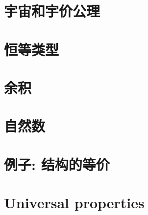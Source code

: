 \section{宇宙和宇价公理}
\label{sec:compute-universe}


\section{恒等类型}
\label{sec:compute-paths}


\section{余积}
\label{sec:compute-coprod}


\section{自然数}
\label{sec:compute-nat}


\section{例子: 结构的等价}
\label{sec:equality-of-structures}


\section{Universal properties}
\label{sec:universal-properties}






